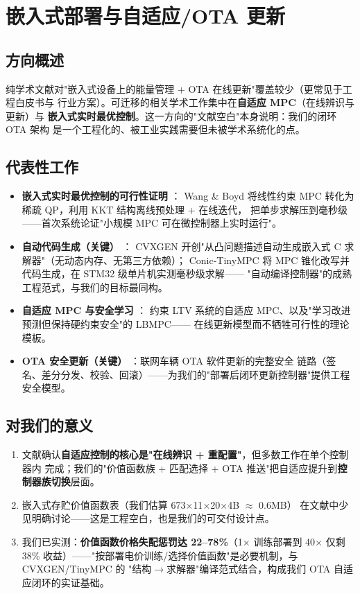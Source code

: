 \documentclass[10pt, twocolumn]{article}
\begin{document}
\section{嵌入式部署与自适应/OTA 更新}\label{sec:embed}

\subsection{方向概述}
纯学术文献对"嵌入式设备上的能量管理 + OTA 在线更新"覆盖较少（更常见于工程白皮书与
行业方案）。可迁移的相关学术工作集中在\textbf{自适应 MPC}（在线辨识与更新）与
\textbf{嵌入式实时最优控制}。这一方向的"文献空白"本身说明：我们的闭环 OTA 架构
是一个工程化的、被工业实践需要但未被学术系统化的点。

\subsection{代表性工作}
\begin{itemize}
\item \textbf{嵌入式实时最优控制的可行性证明} \cite{wang_boyd_fast_mpc}：
Wang \& Boyd 将线性约束 MPC 转化为稀疏 QP，利用 KKT 结构离线预处理 + 在线迭代，
把单步求解压到毫秒级——首次系统论证"小规模 MPC 可在微控制器上实时运行"。
\item \textbf{自动代码生成（关键）} \cite{mattingley_cvxgen, mahajan_tinympc}：
CVXGEN 开创"从凸问题描述自动生成嵌入式 C 求解器"（无动态内存、无第三方依赖）；
Conic-TinyMPC 将 MPC 锥化改写并代码生成，在 STM32 级单片机实测毫秒级求解——
"自动编译控制器"的成熟工程范式，与我们的目标最同构。
\item \textbf{自适应 MPC 与安全学习} \cite{tanaskovic_adaptive_mpc, aswani_lbmpc}：
约束 LTV 系统的自适应 MPC、以及"学习改进预测但保持硬约束安全"的 LBMPC——
在线更新模型而不牺牲可行性的理论模板。
\item \textbf{OTA 安全更新（关键）} \cite{halder_ota}：联网车辆 OTA 软件更新的完整安全
链路（签名、差分分发、校验、回滚）——为我们的"部署后闭环更新控制器"提供工程安全模型。
\end{itemize}

\subsection{对我们的意义}
\begin{enumerate}
\item 文献确认\textbf{自适应控制的核心是"在线辨识 + 重配置"}，但多数工作在单个控制器内
完成；我们的"价值函数族 + 匹配选择 + OTA 推送"把自适应提升到\textbf{控制器族切换}层面。
\item 嵌入式存贮价值函数表（我们估算 673$\times$11$\times$20$\times$4B $\approx$ 0.6MB）
在文献中少见明确讨论——这是工程空白，也是我们的可交付设计点。
\item 我们已实测：\textbf{价值函数价格失配惩罚达 22--78\%}（1$\times$ 训练部署到 40$\times$
仅剩 38\% 收益）——"按部署电价训练/选择价值函数"是必要机制，与 CVXGEN/TinyMPC 的
"结构$\rightarrow$求解器"编译范式结合，构成我们 OTA 自适应闭环的实证基础。
\end{enumerate}
\end{document}
